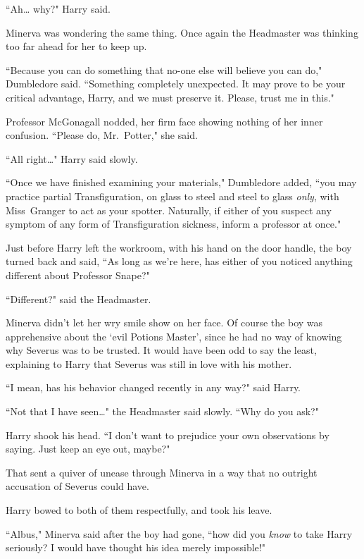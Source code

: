 ``Ah{\ldots} why?" Harry said.

Minerva was wondering the same thing. Once again the Headmaster was thinking too far ahead for her to keep up.

``Because you can do something that no-one else will believe you can do," Dumbledore said. ``Something completely unexpected. It may prove to be your critical advantage, Harry, and we must preserve it. Please, trust me in this."

Professor McGonagall nodded, her firm face showing nothing of her inner confusion. ``Please do, Mr.~Potter," she said.

``All right{\ldots}" Harry said slowly.

``Once we have finished examining your materials," Dumbledore added, ``you may practice partial Transfiguration, on glass to steel and steel to glass \emph{only}, with Miss~Granger to act as your spotter. Naturally, if either of you suspect any symptom of any form of Transfiguration sickness, inform a professor at once."

Just before Harry left the workroom, with his hand on the door handle, the boy turned back and said, ``As long as we're here, has either of you noticed anything different about Professor Snape?"

``Different?" said the Headmaster.

Minerva didn't let her wry smile show on her face. Of course the boy was apprehensive about the `evil Potions Master', since he had no way of knowing why Severus was to be trusted. It would have been odd to say the least, explaining to Harry that Severus was still in love with his mother.

``I mean, has his behavior changed recently in any way?" said Harry.

``Not that I have seen{\ldots}" the Headmaster said slowly. ``Why do you ask?"

Harry shook his head. ``I don't want to prejudice your own observations by saying. Just keep an eye out, maybe?"

That sent a quiver of unease through Minerva in a way that no outright accusation of Severus could have.

Harry bowed to both of them respectfully, and took his leave.

\later

``Albus," Minerva said after the boy had gone, ``how did you \emph{know} to take Harry seriously? I would have thought his idea merely impossible!"

